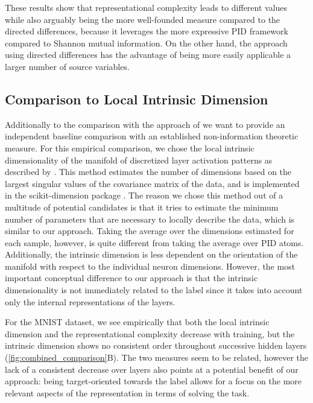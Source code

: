 \documentclass[10pt]{article}
\renewcommand\autoref[1]{\cref{#1}}
\theoremstyle{definition}
\theoremstyle{plain}
\begin{document}
These results show that representational complexity leads to different values while also arguably being the more well-founded measure compared to the directed differences, because it leverages the more expressive PID framework compared to Shannon mutual information. On the other hand, the approach using directed differences has the advantage of being more easily applicable a larger number of source variables.

\subsection{Comparison to Local Intrinsic Dimension}
\label{sec:dimension}

Additionally to the comparison with the approach of \cite{reing_discovering_2021} we want to provide an independent baseline comparison with an established non-information theoretic measure. For this empirical comparison, we chose the local intrinsic dimensionality of the manifold of discretized layer activation patterns as described by \cite{fukunaga1971algorithm}. This method estimates the number of dimensions based on the largest singular values of the covariance matrix of the data, and is implemented in the scikit-dimension package \citep{bac2021scikit}. The reason we chose this method out of a multitude of potential candidates is that it tries to estimate the minimum number of parameters that are necessary to locally describe the data, which is similar to our approach. Taking the average over the dimensions estimated for each sample, however, is quite different from taking the average over PID atoms. Additionally, the intrinsic dimension is less dependent on the orientation of the manifold with respect to the individual neuron dimensions. However, the most important conceptual difference to our approach is that the intrinsic dimensionality is not immediately related to the label since it takes into account only the internal representations of the layers.

For the MNIST dataset, we see empirically that both the local intrinsic dimension and the representational complexity decrease with training, but the intrinsic dimension shows no consistent order throughout successive hidden layers (\autoref{fig:combined_comparison}B). The two measures seem to be related, however the lack of a consistent decrease over layers also points at a potential benefit of our approach: being target-oriented towards the label allows for a focus on the more relevant aspects of the representation in terms of solving the task. 
\end{document}
